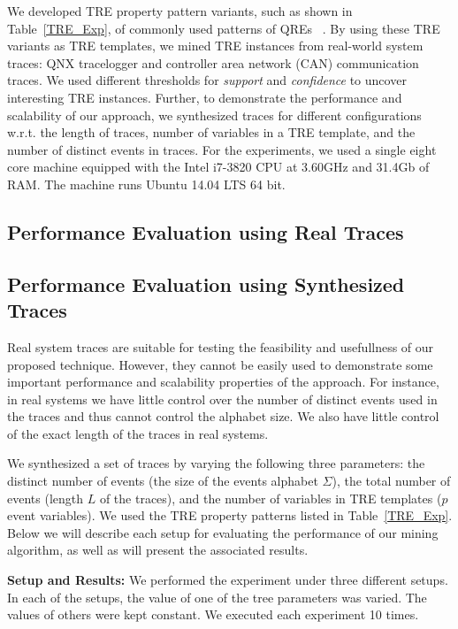 \documentclass[]{sigplanconf}
\begin{document}
We developed TRE property pattern variants, such as shown in Table~\ref{TRE_Exp}, of commonly used patterns of QREs ~\cite{DBLP:conf/paste/YangE04}. By using these TRE variants as TRE templates, we mined TRE instances from real-world system traces: QNX tracelogger and controller area network (CAN) communication traces. We used different thresholds for \emph{support} and \emph{confidence} to uncover interesting TRE instances. Further, to demonstrate the performance and scalability of our approach, we synthesized traces for different configurations w.r.t. the length of traces, number of variables in a TRE template, and the number of distinct events in traces. For the experiments, we used a single eight core machine equipped with the Intel i7-3820 CPU at 3.60GHz and 31.4Gb of RAM. The machine runs Ubuntu 14.04 LTS 64 bit.

\subsection{Performance Evaluation using Real Traces}



\subsection{Performance Evaluation using Synthesized Traces}

Real system traces are suitable for testing the feasibility and usefullness of our proposed technique. However, they cannot be easily used to demonstrate some important performance and scalability properties of the approach. For instance, in real systems we have little control over the number of distinct events used in the traces and thus cannot control the alphabet size. We also have little control of the exact length of the traces in real systems.


We synthesized a set of traces by varying the following three parameters: the distinct number of events (the size of the events alphabet $\Sigma$), the total number of events (length $L$ of the traces), and the number of variables in TRE templates ($p$ event variables). We used the TRE property patterns listed in Table~\ref{TRE_Exp}.
Below we will describe each setup for evaluating the performance of our mining algorithm, as well as will present the associated results.

\vspace{3mm}

\noindent \textbf{Setup and Results:} We performed the experiment under three different setups. In each of the setups, the value of one of the tree parameters was varied. The values of others were kept constant. We executed each experiment 10 times.
\end{document}
